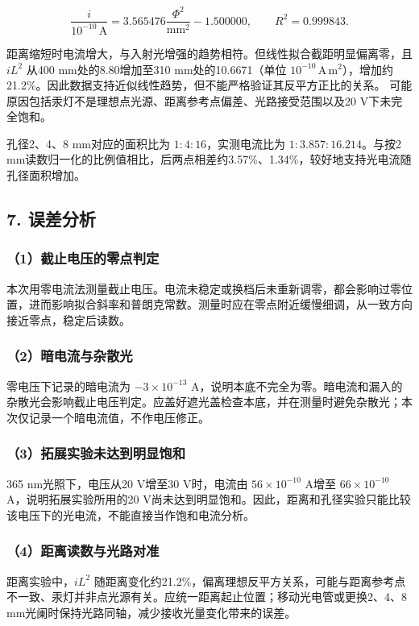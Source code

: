 \begin{equation}
\frac{i}{10^{-10}\,\mathrm A}=3.565476\frac{\Phi^2}{\mathrm{mm^2}}-1.500000,\qquad R^2=0.999843.
\end{equation}

距离缩短时电流增大，与入射光增强的趋势相符。但线性拟合截距明显偏离零，且 $iL^2$ 从400 mm处的8.80增加至310 mm处的10.6671（单位 $10^{-10}\,\mathrm{A\,m^2}$），增加约21.2\%。因此数据支持近似线性趋势，但不能严格验证其反平方正比的关系。
可能原因包括汞灯不是理想点光源、距离参考点偏差、光路接受范围以及20 V下未完全饱和。

孔径2、4、8 mm对应的面积比为 $1:4:16$，实测电流比为 $1:3.857:16.214$。与按2 mm读数归一化的比例值相比，后两点相差约3.57\%、1.34\%，较好地支持光电流随孔径面积增加。



\newpage
\subsection*{7. 误差分析}

\subsubsection*{（1）截止电压的零点判定}

本次用零电流法测量截止电压。电流未稳定或换档后未重新调零，都会影响过零位置，进而影响拟合斜率和普朗克常数。测量时应在零点附近缓慢细调，从一致方向接近零点，稳定后读数。

\subsubsection*{（2）暗电流与杂散光}

零电压下记录的暗电流为 $-3\times10^{-13}$ A，说明本底不完全为零。暗电流和漏入的杂散光会影响截止电压判定。应盖好遮光盖检查本底，并在测量时避免杂散光；本次仅记录一个暗电流值，不作电压修正。

\subsubsection*{（3）拓展实验未达到明显饱和}

365 nm光照下，电压从20 V增至30 V时，电流由 $56\times10^{-10}$ A增至 $66\times10^{-10}$ A，说明拓展实验所用的20 V尚未达到明显饱和。因此，距离和孔径实验只能比较该电压下的光电流，不能直接当作饱和电流分析。

\subsubsection*{（4）距离读数与光路对准}

距离实验中，$iL^2$ 随距离变化约21.2\%，偏离理想反平方关系，可能与距离参考点不一致、汞灯并非点光源有关。应统一距离起止位置；移动光电管或更换2、4、8 mm光阑时保持光路同轴，减少接收光量变化带来的误差。

